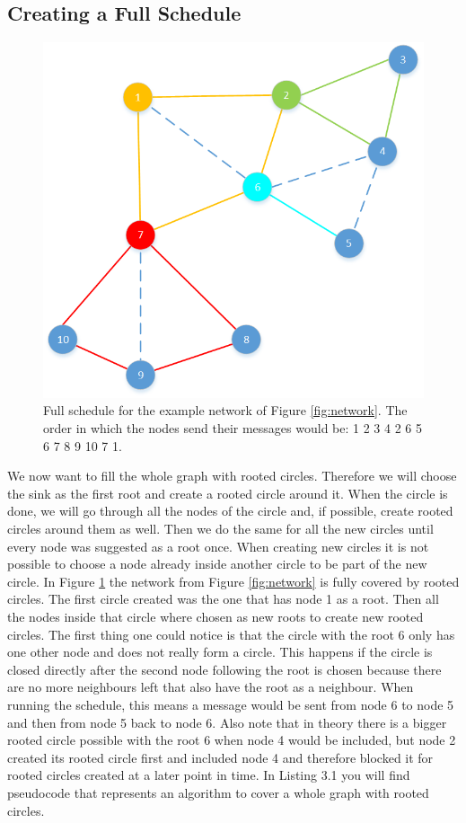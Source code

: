 \subsection{Creating a Full Schedule}
\begin{figure}[htbp]
	\centering         
    \includegraphics[scale=0.6]{content/images/Schedule/FullSchedule}
    \caption{Full schedule for the example network of Figure \ref{fig:network}. The order in which the nodes send their messages would be: 1 2 3 4 2 6 5 6 7 8 9 10 7 1.}
    \label{fig:schedule}
\end{figure} 
We now want to fill the whole graph with rooted circles. Therefore we will choose the sink as the first root and create a rooted circle around it. When the circle is done, we will go through all the nodes of the circle and, if possible, create rooted circles around them as well. Then we do the same for all the new circles until every node was suggested as a root once. When creating new circles it is not possible to choose a node already inside another circle to be part of the new circle. In Figure \ref{fig:schedule} the network from Figure \ref{fig:network} is fully covered by rooted circles. The first circle created was the one that has node 1 as a root. Then all the nodes inside that circle where chosen as new roots to create new rooted circles. The first thing one could notice is that the circle with the root 6 only has one other node and does not really form a circle. This happens if the circle is closed directly after the second node following the root is chosen because there are no more neighbours left that also have the root as a neighbour. When running the schedule, this means a message would be sent from node 6 to node 5 and then from node 5 back to node 6. Also note that in theory there is a bigger rooted circle possible with the root 6 when node 4 would be included, but node 2 created its rooted circle first and included node 4 and therefore blocked it for rooted circles created at a later point in time. In Listing 3.1 you will find pseudocode that represents an algorithm to cover a whole graph with rooted circles.

